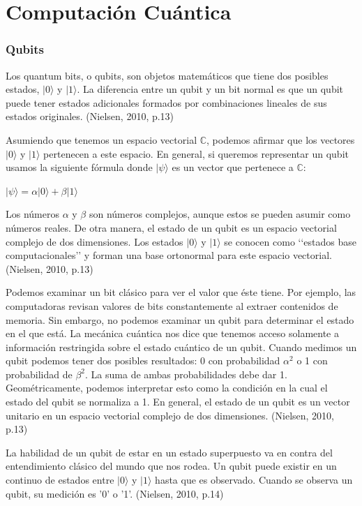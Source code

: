 \documentclass[11pt,a4paper]{article}
\begin{document}
\part{Computación Cuántica}
\section*{Qubits}

Los quantum bits, o qubits, son objetos matemáticos que tiene dos posibles estados,  $\vert 0\rangle$ y $\vert 1\rangle$. La diferencia entre un qubit y un bit normal es que un qubit puede tener estados adicionales formados por combinaciones lineales de sus estados originales. (Nielsen, 2010, p.13)

Asumiendo que tenemos un espacio vectorial $\mathbb{C}$, podemos afirmar que los vectores $\vert 0\rangle$ y $\vert 1\rangle$ pertenecen a este espacio. En general, si queremos representar un qubit usamos la siguiente fórmula donde $\vert \psi \rangle$ es un vector que pertenece a $\mathbb{C}$:

\begin{center}
$\vert \psi \rangle = \alpha \vert 0\rangle + \beta \vert 1\rangle$
\end{center}

Los números $\alpha$ y $\beta$ son números complejos, aunque estos se pueden asumir como números reales. De otra manera, el estado de un qubit es un espacio vectorial complejo de dos dimensiones. Los estados $\vert 0\rangle$ y $\vert 1\rangle$ se conocen como ‘‘estados base computacionales’’ y forman una base ortonormal para este espacio vectorial. (Nielsen, 2010, p.13)

Podemos examinar un bit clásico para ver el valor que éste tiene. Por ejemplo, las computadoras revisan valores de bits constantemente al extraer contenidos de memoria. Sin embargo, no podemos examinar un qubit para determinar el estado en el que está. La mecánica cuántica nos dice que tenemos acceso solamente a información restringida sobre el estado cuántico de un qubit. Cuando medimos un qubit podemos tener dos posibles resultados: 0 con probabilidad $\alpha^2$ o 1 con probabilidad de $\beta^2$. La suma de ambas probabilidades debe dar 1. Geométricamente, podemos interpretar esto como la condición en la cual el estado del qubit se normaliza a 1. En general, el estado de un qubit es un vector unitario en un espacio vectorial complejo de dos dimensiones.  (Nielsen, 2010, p.13)

La habilidad de un qubit de estar en un estado superpuesto va en contra del entendimiento clásico del mundo que nos rodea. Un qubit puede existir en un continuo de estados entre $\vert 0\rangle$ y $\vert 1\rangle$ hasta que es observado. Cuando se observa un qubit, su medición es '0' o '1'. (Nielsen, 2010, p.14)
\end{document}

